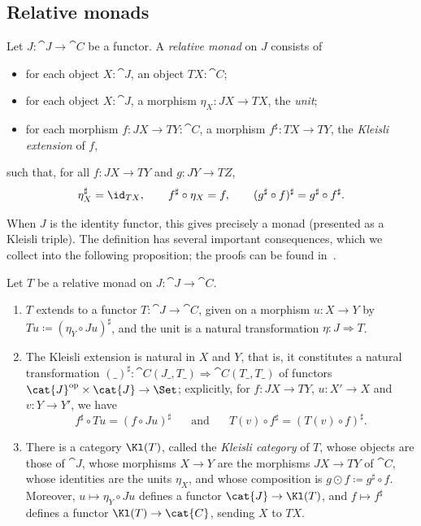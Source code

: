 \subsection{Relative monads}

\begin{definition}
    Let $J : \cat{J} \to \cat{C}$ be a functor. A \emph{relative monad} on $J$ consists of
    \begin{itemize}
        \item for each object $X : \cat{J}$, an object $TX : \cat{C}$;
        \item for each object $X : \cat{J}$, a morphism $\eta_X : JX \to TX$, the \emph{unit};
        \item for each morphism $f : JX \to TY : \cat{C}$, a morphism $f^\sharp : TX \to TY$, the \emph{Kleisli extension} of $f$,
    \end{itemize}
    such that, for all $f : JX \to TY$ and $g : JY \to TZ$,
    \[
    \eta_X^\sharp = \id_{TX}, \qquad
    f^\sharp \circ \eta_X = f, \qquad
    (g^\sharp \circ f)^\sharp = g^\sharp \circ f^\sharp.
    \]
\end{definition}

When $J$ is the identity functor, this gives precisely a monad (presented as a Kleisli triple). The definition has several important consequences, which we collect into the following proposition; the proofs can be found in~\cite[\S\S2.1 and 2.3]{AltenkirchChapmanUustalu2015}.


\begin{proposition}
    Let $T$ be a relative monad on $J : \cat{J} \to \cat{C}$.
    \begin{enumerate}
        \item $T$ extends to a functor $T : \cat{J} \to \cat{C}$, given on a morphism $u : X \to Y$ by $Tu \coloneqq (\eta_Y \circ Ju)^\sharp$, and the unit is a natural transformation $\eta : J \Rightarrow T$.
        \item The Kleisli extension is natural in $X$ and $Y$, that is, it constitutes a natural transformation $(\_)^\sharp : \cat{C}(J\_, T\_) \Rightarrow \cat{C}(T\_, T\_)$ of functors $\cat{J}^{\mathrm{op}} \times \cat{J} \to \Set$; explicitly, for $f : JX \to TY$, $u : X' \to X$ and $v : Y \to Y'$, we have
        \[
        f^\sharp \circ Tu = (f \circ Ju)^\sharp \;\;\;\;\;\text{ and }\;\;\;\;\; T(v) \circ f^\sharp = (T(v) \circ f)^\sharp.
        \]
        \item There is a category $\Kl(T)$, called the \emph{Kleisli category} of $T$, whose objects are those of $\cat{J}$, whose morphisms $X \to Y$ are the morphisms $JX \to TY$ of $\cat{C}$, whose identities are the units $\eta_X$, and whose composition is $g \odot f \coloneqq g^\sharp \circ f$. Moreover, $u \mapsto \eta_Y \circ Ju$ defines a functor $\cat{J} \to \Kl(T)$, and $f \mapsto f^\sharp$ defines a functor $\Kl(T) \to \cat{C}$, sending $X$ to $TX$.
    \end{enumerate}
\end{proposition}

